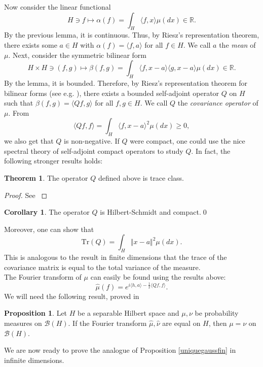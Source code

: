 \documentclass[10pt, a4paper]{report}
\newcommand{\R}[0]{\mathbb{R}}
\theoremstyle{definition}
\newtheorem{theorem}{Theorem}
\newtheorem{prop}{Proposition}
\newtheorem{coro}{Corollary}
\theoremstyle{remark}
\begin{document}
Now consider the linear functional
$$ H \ni f \mapsto \alpha(f)=\int_{H}\langle f,x\rangle \mu(dx) \in \R.$$
By the previous lemma, it is continuous. Thus, by Riesz's representation theorem, there exists some $a \in H$ with $\alpha(f)=\langle f,a\rangle$ for all $f\in H$. We call $a$ the \emph{mean} of $\mu$. Next, consider the symmetric bilinear form 
$$H \times H \ni (f,g) \mapsto \beta(f,g) = \int_{H} \langle f,x-a\rangle \langle g,x-a\rangle \mu(dx) \in \R.$$
By the lemma, it is bounded. Therefore, by Riesz's representation theorem for bilinear forms (see e.g. \cite[Theorem 4.3.13]{hilb}), there exists a bounded self-adjoint operator $Q$ on $H$ such that $\beta(f,g) = \langle Qf,g\rangle$ for all $	f,g\in H$. We call $Q$ the \emph{covariance operator} of $\mu$. From 
$$\langle Qf,f\rangle = \int_{H} \langle f,x-a\rangle^2 \mu(dx) \geq 0,$$
we also get that $Q$ is non-negative. If $Q$ were compact, one could use the nice spectral theory of self-adjoint compact operators to study $Q$. In fact, the following stronger results holds:
\begin{theorem}
	The operator $Q$ defined above is trace class.
	\begin{proof}
		See \cite[Prop.]{prato2}
	\end{proof}
\end{theorem}
\begin{coro}
	The operator $Q$ is Hilbert-Schmidt and compact.\qed
\end{coro}
Moreover, one can show that 
$$\mathrm{Tr}(Q) = \int_H \Vert x-a\Vert^2 \mu(dx).$$
This is analogous to the result in finite dimensions that the trace of the covariance matrix is equal to the total variance of the measure.\\
The Fourier transform of $\mu$ can easily be found using the results above:
$$\widehat{\mu}(f) = e^{i\langle h,a\rangle - \frac{1}{2} \langle Qf,f\rangle }.$$
We will need the following result, proved in \cite[Prop.]{prato2}
\begin{prop}
	Let $H$ be a separable Hilbert space and $\mu, \nu$ be probability measures on $\mathcal{B}(H)$. If the Fourier transform $\hat{\mu},\hat{\nu}$ are equal on $H$, then $\mu = \nu$ on $\mathcal{B}(H)$.
\end{prop}
We are now ready to prove the analogue of Proposition \ref{uniquegaussfin} in infinite dimensions.
\end{document}
